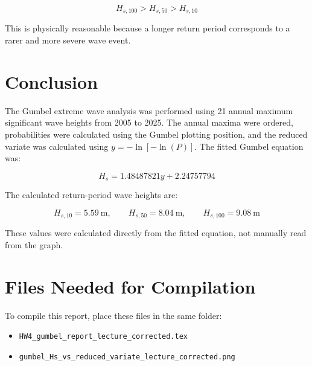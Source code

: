 \documentclass[12pt,a4paper]{article}
\begin{document}
\[
H_{s,100} > H_{s,50} > H_{s,10}
\]

This is physically reasonable because a longer return period corresponds to a rarer and more severe wave event.

\section{Conclusion}

The Gumbel extreme wave analysis was performed using 21 annual maximum significant wave heights from 2005 to 2025. The annual maxima were ordered, probabilities were calculated using the Gumbel plotting position, and the reduced variate was calculated using \(y=-\ln[-\ln(P)]\). The fitted Gumbel equation was:

\[
H_s = 1.48487821y + 2.24757794
\]

The calculated return-period wave heights are:

\[
H_{s,10}=5.59\ \text{m}, \qquad
H_{s,50}=8.04\ \text{m}, \qquad
H_{s,100}=9.08\ \text{m}
\]

These values were calculated directly from the fitted equation, not manually read from the graph.

\section*{Files Needed for Compilation}

To compile this report, place these files in the same folder:

\begin{itemize}
    \item \texttt{HW4\_gumbel\_report\_lecture\_corrected.tex}
    \item \texttt{gumbel\_Hs\_vs\_reduced\_variate\_lecture\_corrected.png}
\end{itemize}
\end{document}
